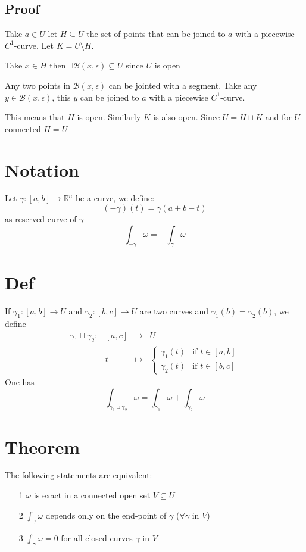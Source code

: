 \documentclass{book}
\begin{document}
\subsection*{Proof}
Take $a\in U$ let $H\subseteq U$ the set of points that can be joined to $a$ with a piecewise $C^1$-curve. Let $K=U\setminus H$. 

Take $x\in H$ then $\exists \mathcal{B}(x,\epsilon)\subseteq U$ since $U$ is open

Any two points in $\mathcal{B}(x,\epsilon)$ can be jointed with a segment. Take any $y\in \mathcal{B}(x,\epsilon)$, this $y$ can be joined to $a$ with a piecewise $C^1$-curve.

This means that $H$ is open. Similarly $K$ is also open. Since $U=H\sqcup K$ and for $U$ connected $H=U$

\section{Notation}
Let $\gamma:[a,b]\rightarrow\mathbb{R}^n$ be a curve, we define:
$$(-\gamma)(t)=\gamma(a+b-t)$$
as reserved curve of $\gamma$
$$\int_{-\gamma}\omega=-\int_\gamma\omega$$
\section{Def}
If $\gamma_1:[a,b]\rightarrow U$ and $\gamma_2:[b,c]\rightarrow U$ are two curves and $\gamma_1(b)=\gamma_2(b)$, we define
$$\begin{aligned}
    \gamma_1\sqcup\gamma_2:&[a,c]&\rightarrow&U\\
    &t&\mapsto&\begin{cases}
        \gamma_1(t) &\text{if }t\in[a,b]\\
        \gamma_2(t) &\text{if }t\in[b,c]
    \end{cases}
\end{aligned}$$
One has
$$\int_{\gamma_1\sqcup\gamma_2}\omega=\int_{\gamma_1}\omega+\int_{\gamma_2}\omega$$
\section{Theorem}
The following statements are equivalent:
\begin{itemize}
    \item[1] $\omega$ is exact in a connected open set $V\subseteq U$
    \item[2] $\int_\gamma\omega$ depends only on the end-point of $\gamma$ ($\forall \gamma$ in $V$)
    \item[3] $\int_\gamma\omega=0$ for all closed curves $\gamma$ in $ V$
\end{itemize}
\end{document}
